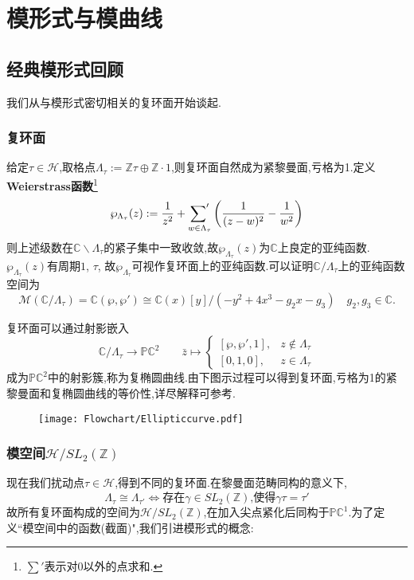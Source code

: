 
\chapter{模形式与模曲线}
\section{经典模形式回顾}
我们从与模形式密切相关的复环面开始谈起.
\subsection{复环面}

给定$\tau \in \mathcal{H}$,取格点$\Lambda_{\tau}:= \mathbb{Z}\tau \oplus \mathbb{Z} \!\cdot\!\! 1$,则复环面自然成为紧黎曼面,亏格为1.定义\textbf{Weierstrass函数}\footnote{$\sum'$表示对0以外的点求和.}
$$\wp_{\Lambda_{\tau}}(z):=\frac{1}{z^2}+ \mathop{\mathord{\sum}'}_{w \in \Lambda_{\tau}}\left( \frac{1}{(z-w)^2}-\frac{1}{w^2} \right)$$
则上述级数在$\mathbb{C} \smallsetminus \Lambda_{\tau}$的紧子集中一致收敛,故$\wp_{\Lambda_{\tau}}(z)$为$\mathbb{C}$上良定的亚纯函数. $\wp_{\Lambda_{\tau}}(z)$有周期$1$, $\tau$, 故$\wp_{\Lambda_{\tau}}$可视作复环面上的亚纯函数.可以证明$\mathbb{C}/\Lambda_{\tau}$上的亚纯函数空间为
$$\mathcal{M}(\mathbb{C}/\Lambda_{\tau})=\mathbb{C}(\wp,\wp') \cong \mathbb{C}(x)[y]/(-y^2+4x^3-g_2x-g_3)\quad g_2,g_3 \in \mathbb{C}. $$

复环面可以通过射影嵌入
$$\mathbb{C}/\Lambda_{\tau} \longrightarrow \mathbb{PC}^2 \qquad \bar{z} \longmapsto \begin{cases}
[\wp,\wp',1], & z \notin \Lambda_{\tau} \\
[0,1,0], & z \in \Lambda_{\tau}
\end{cases} $$
成为$\mathbb{PC}^2$中的射影簇,称为复椭圆曲线.由下图示过程可以得到复环面,亏格为1的紧黎曼面和复椭圆曲线的等价性,详尽解释可参考\cite[第八章]{Li2019modularform}.
\begin{figure}[ht]
	\centering
		\texttt{[image: Flowchart/Ellipticcurve.pdf]}
	\label{pic:Ellipticcurve}
\end{figure}

\subsection{模空间$\mathcal{H}/SL_2(\mathbb{Z})$}
现在我们扰动点$\tau \in \mathcal{H}$,得到不同的复环面.在黎曼面范畴同构的意义下,
$$\Lambda_{\tau} \cong \Lambda_{\tau'} \Longleftrightarrow \text{存在$\gamma \in SL_2(\mathbb{Z})$,使得$\gamma \tau = \tau'$}$$
故所有复环面构成的空间为$\mathcal{H}/SL_2(\mathbb{Z})$,在加入尖点紧化后同构于$\mathbb{PC}^1$.为了定义``模空间中的函数(截面)",我们引进模形式的概念:


